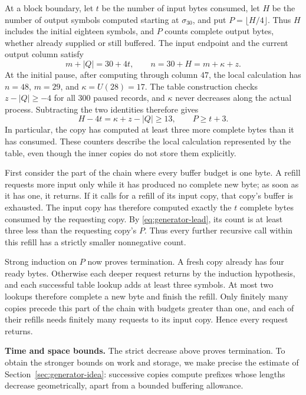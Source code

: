 At a block boundary, let $t$ be the number of input bytes consumed,
let $H$ be the number of output symbols computed starting at
$\sigma_{30}$, and put $P=\lfloor H/4\rfloor$. Thus $H$ includes the
initial eighteen symbols, and $P$ counts complete output bytes,
whether already supplied or still buffered. The input endpoint and the
current output column satisfy
\[
 m+|Q|=30+4t,\qquad n=30+H=m+\kappa+z.
\]
At the initial pause, after computing through column $47$, the local
calculation has $n=48$, $m=29$, and $\kappa=U(28)=17$. The table
construction checks $z-|Q|\ge-4$ for all $300$ paused records, and
$\kappa$ never decreases along the actual process. Subtracting the
two identities therefore gives
\begin{equation}\label{eq:generator-lead}
 H-4t=\kappa+z-|Q|\ge13,
 \qquad P\ge t+3.
\end{equation}
In particular, the copy has computed at least three more complete
bytes than it has consumed. These counters describe the local
calculation represented by the table, even though the inner copies do
not store them explicitly.

First consider the part of the chain where every buffer budget is one
byte. A refill requests more input only while it has produced no
complete new byte; as soon as it has one, it returns. If it calls for
a refill of its input copy, that copy's buffer is exhausted. The
input copy has therefore computed exactly the $t$ complete bytes
consumed by the requesting copy. By \eqref{eq:generator-lead}, its
count is at least three less than the requesting copy's $P$. Thus
every further recursive call within this refill has a strictly
smaller nonnegative count.

Strong induction on $P$ now proves termination. A fresh copy already
has four ready bytes. Otherwise each deeper request returns by the
induction hypothesis, and each successful table lookup adds at least
three symbols. At most two lookups therefore complete a new byte and
finish the refill. Only finitely many copies precede this part of the
chain with budgets greater than one, and each of their refills needs
finitely many requests to its input copy. Hence every request
returns.

\medskip\noindent
\textbf{Time and space bounds.}
The strict decrease above proves termination. To obtain the stronger
bounds on work and storage, we make precise the estimate of
Section~\ref{sec:generator-idea}: successive copies compute prefixes
whose lengths decrease geometrically, apart from a bounded buffering
allowance.

